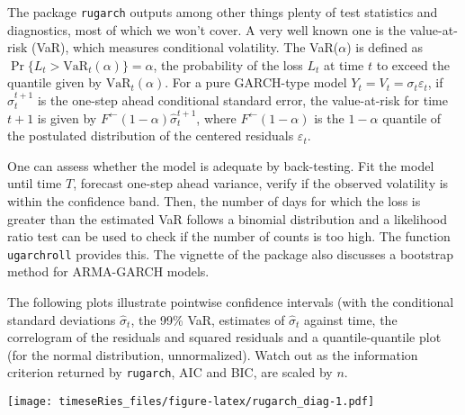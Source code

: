 \documentclass[]{book}
\newenvironment{Shaded}{\begin{snugshade}}{\end{snugshade}}
\newcommand{\KeywordTok}[1]{\textcolor[rgb]{0.13,0.29,0.53}{\textbf{#1}}}
\newcommand{\DataTypeTok}[1]{\textcolor[rgb]{0.13,0.29,0.53}{#1}}
\newcommand{\DecValTok}[1]{\textcolor[rgb]{0.00,0.00,0.81}{#1}}
\newcommand{\CommentTok}[1]{\textcolor[rgb]{0.56,0.35,0.01}{\textit{#1}}}
\newcommand{\NormalTok}[1]{#1}
\begin{document}
The package \texttt{rugarch} outputs among other things plenty of test
statistics and diagnostics, most of which we won't cover. A very well
known one is the value-at-risk (VaR), which measures conditional
volatility. The VaR(\(\alpha\)) is defined as
\(\Pr\{L_{t}>\mathrm{VaR}_t(\alpha)\}=\alpha\), the probability of the
loss \(L_t\) at time \(t\) to exceed the quantile given by
\(\mathrm{VaR}_t(\alpha)\). For a pure GARCH-type model
\(Y_t=V_t=\sigma_t\varepsilon_t\), if \(\hat{\sigma}_t^{t+1}\) is the
one-step ahead conditional standard error, the value-at-risk for time
\(t+1\) is given by \(F^{\leftarrow}(1-\alpha)\hat{\sigma}_t^{t+1}\),
where \(F^{\leftarrow}(1-\alpha)\) is the \(1-\alpha\) quantile of the
postulated distribution of the centered residuals \(\varepsilon_t\).

One can assess whether the model is adequate by back-testing. Fit the
model until time \(T\), forecast one-step ahead variance, verify if the
observed volatility is within the confidence band. Then, the number of
days for which the loss is greater than the estimated VaR follows a
binomial distribution and a likelihood ratio test can be used to check
if the number of counts is too high. The function \texttt{ugarchroll}
provides this. The vignette of the package also discusses a bootstrap
method for ARMA-GARCH models.

The following plots illustrate pointwise confidence intervals (with the
conditional standard deviations \(\hat{\sigma}_t\), the 99\% VaR,
estimates of \(\hat{\sigma}_t\) against time, the correlogram of the
residuals and squared residuals and a quantile-quantile plot (for the
normal distribution, unnormalized). Watch out as the information
criterion returned by \texttt{rugarch}, AIC and BIC, are scaled by
\(n\).

\begin{Shaded}
\end{Shaded}

\texttt{[image: timeseRies\_files/figure-latex/rugarch\_diag-1.pdf]}

\begin{Shaded}
\end{Shaded}
\end{document}
